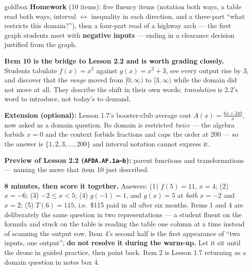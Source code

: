 \documentclass[10pt]{article}
\begin{document}
\boxguard[18]
\begin{skillbox}{goldbox}
\textbf{Homework} (10 items): five fluency items (notation both ways, a table read both ways,
interval $\leftrightarrow$ inequality in each direction, and a three-part ``what restricts this
domain?''), then a four-part read of a highway arch --- the first graph students meet with
\textbf{negative inputs} --- ending in a clearance decision justified from the graph.

\textbf{Item 10 is the bridge to Lesson 2.2 and is worth grading closely.} Students tabulate
$f(x)=x^2$ against $g(x)=x^2+3$, see every output rise by $3$, and discover that the \emph{range}
moved from $[0,\infty)$ to $[3,\infty)$ while the domain did not move at all. They describe the
shift in their own words; \emph{translation} is 2.2's word to introduce, not today's to demand.

\textbf{Extension (optional):} Lesson 1.7's booster-club average cost $A(x)=\frac{6x+240}{x}$,
now asked as a domain question. Its domain is restricted \emph{twice} --- the algebra forbids
$x=0$ and the context forbids fractions and caps the order at 200 --- so the answer is
$\{1,2,3,\dots,200\}$ and interval notation cannot express it.

\textbf{Preview of Lesson 2.2 (\texttt{AFDA.AF.1a--b}):} parent functions and transformations ---
naming the move that item 10 just described.
\end{skillbox}

\boxguard[18]
\begin{teachernote}[Warm-Up]
    \textbf{8 minutes, then score it together.} Answers: (1) $f(5)=11$, $x=4$; (2) $x=-6$;
    (3) $-2 \le x < 5$; (4) $g(-1)=1$, and $g(x)=5$ at \emph{both} $x=-2$ and $x=2$;
    (5) $T(6)=115$, i.e.\ \$115 paid in all after six months. Items 1 and 4 are deliberately the
    same question in two representations --- a student fluent on the formula and stuck on the table
    is reading the table one column at a time instead of scanning the output row. Item 4's second
    half is the first appearance of ``two inputs, one output''; \textbf{do not resolve it during
    the warm-up.} Let it sit until the drone in guided practice, then point back. Item 2 is
    Lesson 1.7 returning as a domain question in notes box 4.
\end{teachernote}
\end{document}
